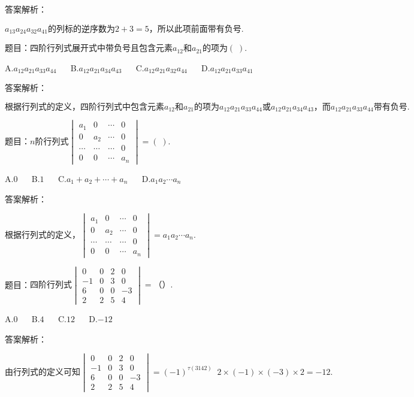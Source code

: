 答案解析：

$a_{13}a_{24}a_{32}a_{41}\mathrm{的列标的逆序数为}2+3=5，\mathrm{所以此项前面带有负号}.$



题目：$\mathrm{四阶行列式展开式中带负号且包含元素}a_{12}和a_{21}\mathrm{的项为}(\;).$

A.$a_{12}a_{21}a_{33}a_{44}$ $\quad$ B.$a_{12}a_{21}a_{34}a_{43}$ $\quad$ C.$a_{12}a_{21}a_{32}a_{44}$ $\quad$ D.$a_{12}a_{21}a_{33}a_{41}$

答案解析：

$\mathrm{根据行列式的定义}，\mathrm{四阶行列式中包含元素}a_{12}和a_{21}\mathrm{的项为}a_{12}a_{21}a_{33}a_{44}或a_{12}a_{21}a_{34}a_{43}，而a_{12}a_{21}a_{33}a_{44}\mathrm{带有负号}.$



题目：$n\mathrm{阶行列式}\begin{vmatrix}a_1&0&\cdots&0\\0&a_2&\cdots&0\\\cdots&\cdots&\cdots&0\\0&0&\cdots&a_n\end{vmatrix}=(\;).$

A.$0$ $\quad$ B.$1$ $\quad$ C.$a_1+a_2+\cdots+a_n$ $\quad$ D.$a_1a_2\cdots a_n$

答案解析：

$\mathrm{根据行列式的定义}，\begin{vmatrix}a_1&0&\cdots&0\\0&a_2&\cdots&0\\\cdots&\cdots&\cdots&0\\0&0&\cdots&a_n\end{vmatrix}=a_1a_2\cdots a_n.$



题目：$\mathrm{四阶行列式}\begin{vmatrix}0&0&2&0\\-1&0&3&0\\6&0&0&-3\\2&2&5&4\end{vmatrix}=（）.$

A.$0$ $\quad$ B.$4$ $\quad$ C.$12$ $\quad$ D.$-12$

答案解析：

$\mathrm{由行列式的定义可知}\begin{vmatrix}0&0&2&0\\-1&0&3&0\\6&0&0&-3\\2&2&5&4\end{vmatrix}=(-1)^{\tau(3142)}\;\;2\times(-1)\times(-3)\times2=-12.$




